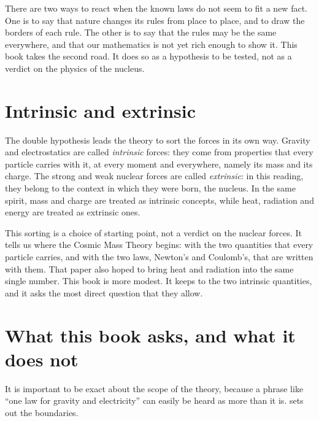 \begin{plainwords}
There are two ways to react when the known laws do not seem to fit a new fact. One is to say that nature changes its rules from place to place, and to draw the borders of each rule. The other is to say that the rules may be the same everywhere, and that our mathematics is not yet rich enough to show it. This book takes the second road. It does so as a hypothesis to be tested, not as a verdict on the physics of the nucleus.
\end{plainwords}

\section{Intrinsic and extrinsic}\label{sec:intrinsic}

The double hypothesis leads the theory to sort the forces in its own way. Gravity and electrostatics are called \emph{intrinsic} forces: they come from properties that every particle carries with it, at every moment and everywhere, namely its mass and its charge. The strong and weak nuclear forces are called \emph{extrinsic}: in this reading, they belong to the context in which they were born, the nucleus. In the same spirit, mass and charge are treated as intrinsic concepts, while heat, radiation and energy are treated as extrinsic ones.

This sorting is a choice of starting point, not a verdict on the nuclear forces. It tells us where the Cosmic Mass Theory begins: with the two quantities that every particle carries, and with the two laws, Newton's and Coulomb's, that are written with them. That paper also hoped to bring heat and radiation into the same single number. This book is more modest. It keeps to the two intrinsic quantities, and it asks the most direct question that they allow.

\section{What this book asks, and what it does not}\label{sec:scope}

It is important to be exact about the scope of the theory, because a phrase like \enquote{one law for gravity and electricity} can easily be heard as more than it is.  sets out the boundaries.

